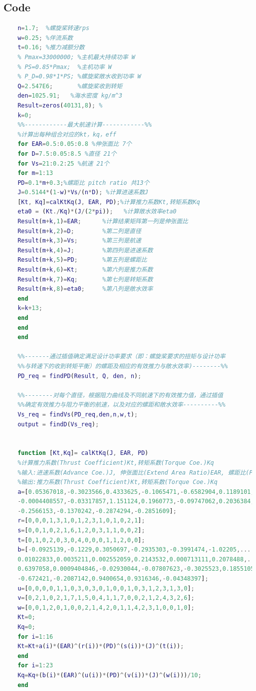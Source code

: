 \documentclass[a4paper,UTF8]{article}
\begin{document}
\begin{appendices}
	\section{Code}
	\begin{lstlisting}[language={Matlab},caption={Caculate Max Speed}]
	%初始化参数
	n=1.7;  %螺旋桨转速rps
	w=0.25; %伴流系数
	t=0.16; %推力减额分数
	% Pmax=33000000; %主机最大持续功率 W
	% PS=0.85*Pmax;  %主机功率 W
	% P_D=0.98*1*PS; %螺旋桨敞水收到功率 W
	Q=2.547E6;       %螺旋桨收到转矩
	den=1025.91;   %海水密度 kg/m^3
	Result=zeros(40131,8); %
	k=0;
	%%------------最大航速计算------------%%
	%计算出每种组合对应的kt，kq，eff
	for EAR=0.5:0.05:0.8 %伸张面比 7个
	for D=7.5:0.05:8.5 %直径 21个
	for Vs=21:0.2:25 %航速 21个
	for m=1:13
	PD=0.1*m+0.3;%螺距比 pitch ratio 共13个
	J=0.5144*(1-w)*Vs/(n*D); %计算进速系数J
	[Kt, Kq]=calKtKq(J, EAR, PD);%计算推力系数Kt,转矩系数Kq
	eta0 = (Kt./Kq)*(J/(2*pi));   %计算敞水效率eta0
	Result(m+k,1)=EAR;      %计算结果矩阵第一列是伸张面比
	Result(m+k,2)=D;        %第二列是直径
	Result(m+k,3)=Vs;       %第三列是航速
	Result(m+k,4)=J;        %第四列是进速系数
	Result(m+k,5)=PD;       %第五列是螺距比
	Result(m+k,6)=Kt;       %第六列是推力系数
	Result(m+k,7)=Kq;       %第七列是转矩系数
	Result(m+k,8)=eta0;     %第八列是敞水效率
	end
	k=k+13;
	end
	end
	end
	
	%%-------通过插值确定满足设计功率要求（即：螺旋桨要求的扭矩与设计功率
	%%与转速下的收到转矩平衡）的螺距及相应的有效推力与敞水效率)--------%%
	PD_req = findPD(Result, Q, den, n);
	
	%%--------对每个直径，根据阻力曲线及不同航速下的有效推力值，通过插值
	%%确定有效推力与阻力平衡的航速，以及对应的螺距和敞水效率----------%%
	Vs_req = findVs(PD_req,den,n,w,t);
	output = findD(Vs_req);
	
	
	function [Kt,Kq]= calKtKq(J, EAR, PD)
	%计算推力系数(Thrust Coefficient)Kt,转矩系数(Torque Coe.)Kq
	%输入:进速系数(Advance Coe.)J, 伸张面比(Extend Area Ratio)EAR, 螺距比(Pitch Ratio)PD
	%输出:推力系数(Thrust Coefficient)Kt,转矩系数(Torque Coe.)Kq
	a=[0.05367018,-0.3023566,0.4333625,-0.1065471,-0.6582904,0.1189101, ...
	-0.0004408557,-0.03317857,1.151124,0.1960773,-0.09747062,0.2036384, ...
	-0.2566153,-0.1370242,-0.2874294,-0.2851609];
	r=[0,0,0,1,3,1,0,1,2,3,1,0,1,0,2,1];
	s=[0,0,1,0,2,1,6,1,2,0,3,1,1,0,0,2];
	t=[0,1,0,2,0,3,0,4,0,0,0,1,1,2,0,0];
	b=[-0.0925139,-0.1229,0.3050697,-0.2935303,-0.3991474,-1.02205,...
	0.01022833,0.0035211,0.002552059,0.2143532,0.000713111,0.2078488,...
	0.6397058,0.0009404846,-0.02930044,-0.07807623,-0.3025523,0.1855105,...
	-0.672421,-0.2087142,0.9400654,0.9316346,-0.04348397];
	u=[0,0,0,0,1,1,0,3,0,3,0,1,0,0,1,0,3,1,2,3,1,3,0];
	v=[0,2,1,0,2,1,7,1,5,0,4,1,1,7,0,0,2,1,2,4,3,2,6];
	w=[0,0,1,2,0,1,0,0,2,1,4,2,0,1,1,4,2,3,1,0,0,1,0];
	Kt=0;
	Kq=0;
	for i=1:16
	Kt=Kt+a(i)*(EAR)^(r(i))*(PD)^(s(i))*(J)^(t(i));
	end
	for i=1:23
	Kq=Kq+(b(i)*(EAR)^(u(i))*(PD)^(v(i))*(J)^(w(i)))/10;
	end
	

\end{lstlisting}
\end{appendices}
\end{document}
